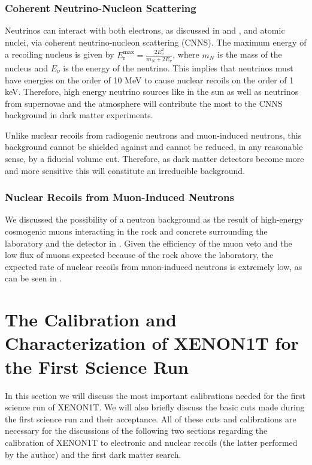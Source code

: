\subsubsection{Coherent Neutrino-Nucleon Scattering}

Neutrinos can interact with both electrons, as discussed in  and , and atomic nuclei, via coherent neutrino-nucleon scattering (CNNS).  The maximum energy of a recoiling nucleus is given by $E_{\textrm{r}}^{\textrm{max}} = \frac{2 E_{\nu}^2}{m_N + 2 E_{\nu}}$, where $m_N$ is the mass of the nucleus and $E_{\nu}$ is the energy of the neutrino.  This implies that neutrinos must have energies on the order of 10 MeV to cause nuclear recoils on the order of 1 keV.  Therefore, high energy neutrino sources like  in the sun as well as neutrinos from supernovae and the atmosphere will contribute the most to the CNNS background in dark matter experiments.

Unlike nuclear recoils from radiogenic neutrons and muon-induced neutrons, this background cannot be shielded against and cannot be reduced, in any reasonable sense, by a fiducial volume cut.  Therefore, as dark matter detectors become more and more sensitive this will constitute an irreducible background.

\subsubsection{Nuclear Recoils from Muon-Induced Neutrons}

We discussed the possibility of a neutron background as the result of high-energy cosmogenic muons interacting in the rock and concrete surrounding the laboratory and the detector in .  Given the efficiency of the muon veto and the low flux of muons expected because of the rock above the laboratory, the expected rate of nuclear recoils from muon-induced neutrons is extremely low, as can be seen in .



\section{The Calibration and Characterization of XENON1T for the First Science Run}
\label{sec:xe1t_calibrations}

In this section we will discuss the most important calibrations needed for the first science run of XENON1T.  We will also briefly discuss the basic cuts made during the first science run and their acceptance.  All of these cuts and calibrations are necessary for the discussions of the following two sections regarding the calibration of XENON1T to electronic and nuclear recoils (the latter performed by the author) and the first dark matter search.


